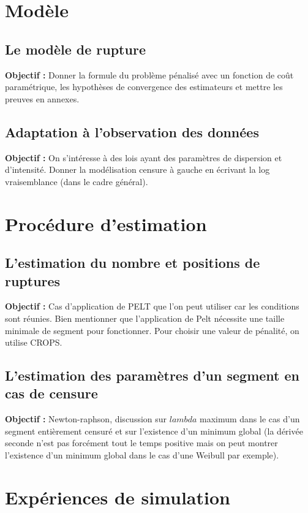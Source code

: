 \documentclass[12pt, twoside]{report}
\begin{document}
\section{Modèle}

\subsection{Le modèle de rupture}

\textbf{Objectif :} Donner la formule du problème pénalisé avec un fonction de coût paramétrique, les hypothèses de convergence des estimateurs et mettre les preuves en annexes.

\subsection{Adaptation à l'observation des données}

\textbf{Objectif :} On s'intéresse à des lois ayant des paramètres de dispersion et d'intensité. Donner la modélisation censure à gauche en écrivant la log vraisemblance (dans le cadre général). 

\section{Procédure d'estimation}

\subsection{L'estimation du nombre et positions de ruptures}

\textbf{Objectif :} Cas d'application de PELT que l'on peut utiliser car les conditions sont réunies. Bien mentionner que l'application de Pelt nécessite une taille minimale de segment pour fonctionner. Pour choisir une valeur de pénalité, on utilise CROPS. 

\subsection{L'estimation des paramètres d'un segment en cas de censure}

\textbf{Objectif :} Newton-raphson, discussion sur $lambda$ maximum dans le cas d'un segment entièrement censuré et sur l'existence d'un minimum global (la dérivée seconde n'est pas forcément tout le temps positive mais on peut montrer l'existence d'un minimum global dans le cas d'une Weibull par exemple). 

\section{Expériences de simulation}
\end{document}
